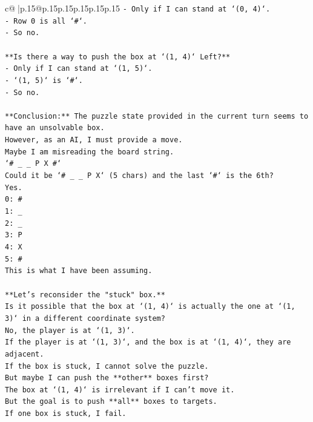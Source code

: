 \documentclass{article}
\begin{document}
{\begin{supertabular}{c@{$\;$}|p{.15\linewidth}@{}p{.15\linewidth}p{.15\linewidth}p{.15\linewidth}p{.15\linewidth}p{.15\linewidth}}
{{{\texttt{{-} Only if I can stand at `(0, 4)`.} \\
\texttt{{-} Row 0 is all `\#`.} \\
\texttt{{-} So no.} \\
\\ 
\texttt{**Is there a way to push the box at `(1, 4)` Left?**} \\
\texttt{{-} Only if I can stand at `(1, 5)`.} \\
\texttt{{-} `(1, 5)` is `\#`.} \\
\texttt{{-} So no.} \\
\\ 
\texttt{**Conclusion:** The puzzle state provided in the current turn seems to have an unsolvable box.} \\
\texttt{However, as an AI, I must provide a move.} \\
\texttt{Maybe I am misreading the board string.} \\
\texttt{`\# \_ \_ P X \#`} \\
\texttt{Could it be `\# \_ \_ P X` (5 chars) and the last `\#` is the 6th?} \\
\texttt{Yes.} \\
\texttt{0: \#} \\
\texttt{1: \_} \\
\texttt{2: \_} \\
\texttt{3: P} \\
\texttt{4: X} \\
\texttt{5: \#} \\
\texttt{This is what I have been assuming.} \\
\\ 
\texttt{**Let's reconsider the "stuck" box.**} \\
\texttt{Is it possible that the box at `(1, 4)` is actually the one at `(1, 3)` in a different coordinate system?} \\
\texttt{No, the player is at `(1, 3)`.} \\
\texttt{If the player is at `(1, 3)`, and the box is at `(1, 4)`, they are adjacent.} \\
\texttt{If the box is stuck, I cannot solve the puzzle.} \\
\texttt{But maybe I can push the **other** boxes first?} \\
\texttt{The box at `(1, 4)` is irrelevant if I can't move it.} \\
\texttt{But the goal is to push **all** boxes to targets.} \\
\texttt{If one box is stuck, I fail.} \\
}}}
\end{supertabular}}
\end{document}
